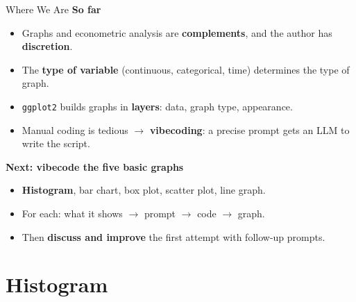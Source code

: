 \documentclass[9pt,aspectratio=169]{beamer}
\begin{document}
\begin{frame}{Where We Are}
\linespread{1.2}\selectfont
\textbf{So far}
  \begin{itemize}
    \item Graphs and econometric analysis are \textbf{complements}, and the author has \textbf{discretion}.
    \item The \textbf{type of variable} (continuous, categorical, time) determines the type of graph.
    \item \texttt{ggplot2} builds graphs in \textbf{layers}: data, graph type, appearance.
    \item Manual coding is tedious $\rightarrow$ \textbf{vibecoding}: a precise prompt gets an LLM to write the script.
  \end{itemize}
\pause
\vspace{0.3cm}
\textbf{Next: vibecode the five basic graphs}
  \begin{itemize}
    \item \textbf{Histogram}, bar chart, box plot, scatter plot, line graph.
    \item For each: what it shows $\rightarrow$ prompt $\rightarrow$ code $\rightarrow$ graph.
    \item Then \textbf{discuss and improve} the first attempt with follow-up prompts.
  \end{itemize}
\end{frame}

\section{Histogram}
\end{document}

